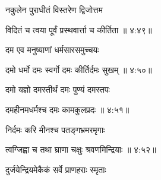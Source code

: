 {\devanagarifont नकुलेन पुराधीतं विस्तरेण द्विजोत्तम \thinspace{\dandab} \dontdisplaylinenum }%


{\devanagarifont विदितं च त्वया पूर्वं प्रस्थवार्त्ता च कीर्तिता {॥ ४:४९॥} \veg\dontdisplaylinenum }%


{\devanagarifont दम एव मनुष्याणां धर्मसारसमुच्चयः \thinspace{\dandab} \dontdisplaylinenum }%


{\devanagarifont दमो धर्मो दमः स्वर्गो दमः कीर्तिर्दमः सुखम् {॥ ४:५०॥} \veg\dontdisplaylinenum }%

{\devanagarifont दमो यज्ञो दमस्तीर्थं दमः पुण्यं दमस्तपः \thinspace{\dandab} \dontdisplaylinenum }%


{\devanagarifont दमहीनमधर्मश्च दमः कामकुलप्रदः {॥ ४:५१॥} \veg\dontdisplaylinenum }%

{\devanagarifont निर्दमः करि मीनश्च पतङ्गभ्रमरमृगाः \thinspace{\dandab} \dontdisplaylinenum }%


{\devanagarifont त्वग्जिह्वा च तथा घ्राणा चक्षुः श्रवणमिन्द्रियाः {॥ ४:५२॥} \veg\dontdisplaylinenum }%

{\devanagarifont दुर्जयेन्द्रियमेकैकं सर्वे प्राणहराः स्मृताः \thinspace{\dandab} \dontdisplaylinenum }%

